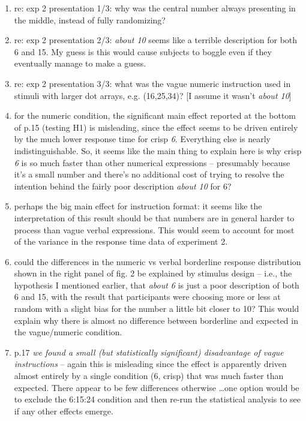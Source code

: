 \documentclass{tufte-handout}
\begin{document}
\begin{enumerate}
\item re: exp 2 presentation 1/3: why was the central number always presenting in the middle, instead of fully randomizing?

\item re: exp 2 presentation 2/3: \emph{about 10} seems like a terrible description for both 6 and 15. My guess is this would cause subjects to boggle even if they eventually manage to make a guess.

\item re: exp 2 presentation 3/3: what was the vague numeric instruction used in stimuli with larger dot arrays, e.g. (16,25,34)? [I assume it wasn't \emph{about 10}]

\item for the numeric condition, the significant main effect reported at the bottom of p.15 (testing H1) is misleading, since the effect seems to be driven entirely by the much lower response time for crisp \emph{6}. Everything else is nearly indistinguishable. So, it seems like the main thing to explain here is why crisp \emph{6} is so much faster than other numerical expressions -- presumably because it's a small number and there's no additional cost of trying to resolve the intention behind the fairly poor description \emph{about 10} for 6?

\item perhaps the big main effect for instruction format: it seems like the interpretation of this result should be that numbers are in general harder to process than vague verbal expressions. This would seem to account for most of the variance in the response time data of experiment 2.

\item could the differences in the numeric vs verbal borderline response distribution shown in the right panel of fig. 2 be explained by stimulus design -- i.e., the hypothesis I mentioned earlier, that \emph{about 6} is just a poor description of both 6 and 15, with the result that participants were choosing more or less at random with a slight bias for the number a little bit closer to 10? This would explain why there is almost no difference between borderline and expected in the vague/numeric condition.

\item p.17 \emph{we found a small (but statistically significant) disadvantage of vague instructions} -- again this is misleading since the effect is apparently driven almost entirely by a single condition (6, crisp) that was much faster than expected. There appear to be few differences otherwise \ldots one option would be to exclude the 6:15:24 condition and then re-run the statistical analysis to see if any other effects emerge.


\end{enumerate}
\end{document}
